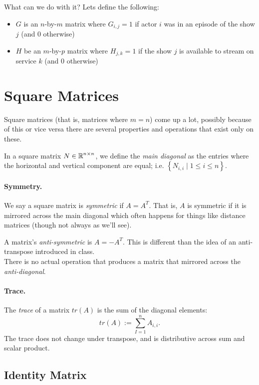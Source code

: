 What can we do with it? Lets define the following:
\begin{itemize}
\item $G$ is an $n$-by-$m$ matrix where $G_{i,j}=1$ if actor $i$ was in an episode of the show $j$ (and $0$ otherwise)
\item $H$ be an $m$-by-$p$ matrix where $H_{j,k}=1$ if the show $j$ is available to stream on service $k$ (and $0$ otherwise) 
\end{itemize}


\section{Square Matrices}
Square matrices (that is, matrices where $m=n$) come up a lot, 
possibly because of this or vice versa there are several properties and operations that exist only on these. 

In a square matrix $N\in\operatorname{\mathbb{R}}^{n\times n}$, we define the \emph{main diagonal} as the entries where the horizontal and vertical component are equal; 
i.e. $\left\{N_{i,i} \mid 1 \le i \le n\right\}$. 

\paragraph{Symmetry.}
We say a square matrix is \emph{symmetric} if $A=A^T$.
That is, $A$ is symmetric if it is mirrored across the main diagonal which often happens for things like distance matrices (though not always as we'll see). 

\begin{aside}
A matrix's \textit{anti-symmetric} is $A = -A^T$. This is different than the idea of an anti-transpose introduced in class. \\

There is no actual operation that produces a matrix that mirrored across the \textit{anti-diagonal}.
\end{aside}

\paragraph{Trace. }
The \emph{trace} of a matrix $tr(A)$ is the sum of the diagonal elements: \[tr(A) := \sum_{I=1}^n A_{i,i}.\] 
The trace does not change under transpose, and is distributive across sum and scalar product. 

\subsection{Identity Matrix}

